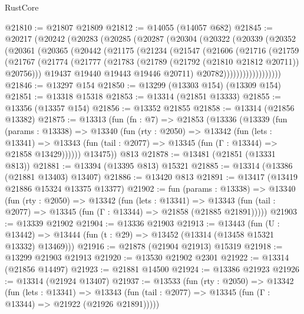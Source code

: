 \begin{lexlean}{RustCore}
\begin{coremodule}
@21810 := @21807 @21809
@21812 := @14055 (@14057 @682)
@21845 := @20217
    (@20242
      (@20283
        (@20285
          (@20287
            (@20304
              (@20322
                (@20339
                  (@20352
                    (@20361
                      (@20365
                        (@20442
                          (@21175
                            (@21234
                              (@21547
                                (@21606
                                  (@21716
                                    (@21759
                                      (@21767
                                        (@21774
                                          (@21777
                                            (@21783
                                              (@21789 (@21792 (@21810 @21812 @20711)) @20756)))
                                          @19437
                                          @19440
                                          @19443
                                          @19446
                                          @20711)
                                        @20782))))))))))))))))))
@21846 := @13297 @154
@21850 := @13299 (@13303 @154) (@13309 @154)
@21851 := @13318 @15318
@21853 := @13314 (@21851 @13333)
@21855 := @13356 (@13357 @154)
@21856 := @13352 @21855
@21858 := @13314 (@21856 @13382)
@21875 := @13313
    (fun (fn : @7) =>
    @21853
      (@13336
        (@13339
          (fun (params : @13338) =>
          @13340
            (fun (rty : @2050) =>
            @13342
              (fun (lets : @13341) =>
              @13343 (fun (tail : @2077) => @13345 (fun (Γ : @13344) => @21858 @13429))))))
        @13475))
    @813
@21878 := @13481 (@21851 (@13331 @813))
@21881 := @13394 (@13395 @813) @15321
@21885 := @13314 (@13386 (@21881 @13403) @13407)
@21886 := @13420 @813
@21891 := @13417 (@13419 @21886 @15324 @13375 @13377)
@21902 := fun (params : @13338) =>
  @13340
    (fun (rty : @2050) =>
    @13342
      (fun (lets : @13341) =>
      @13343 (fun (tail : @2077) => @13345 (fun (Γ : @13344) => @21858 (@21885 @21891)))))
@21903 := @13339 @21902
@21904 := @13336 @21903
@21913 := @13443
    (fun (U : @13442) => @13444 (fun (t : @29) => @13452 (@13314 (@13458 @15321 @13332) @13469)))
@21916 := @21878 (@21904 @21913) @15319
@21918 := @13299 @21903 @21913
@21920 := @13530 @21902 @2301
@21922 := @13314 (@21856 @14497)
@21923 := @21881 @14500
@21924 := @13386 @21923
@21926 := @13314 (@21924 @13407)
@21937 := @13533
    (fun (rty : @2050) =>
    @13342
      (fun (lets : @13341) =>
      @13343 (fun (tail : @2077) => @13345 (fun (Γ : @13344) => @21922 (@21926 @21891)))))

\end{coremodule}
\end{lexlean}

